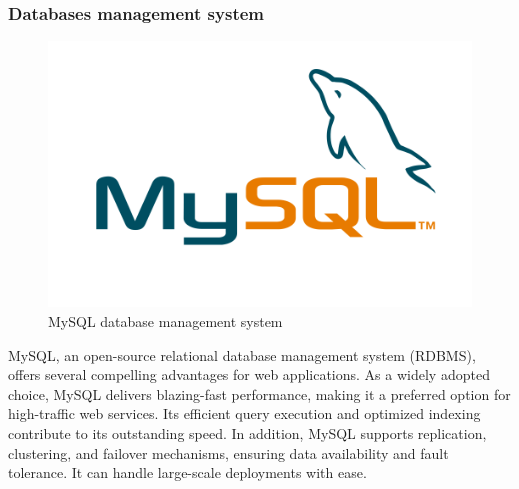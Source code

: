     \subsubsection{Databases management system} \label{Databases management system}
    \begin{figure}[H]
			\centering
			\includegraphics[scale=0.15]{graphics/mysql-logo.png}
			\caption{MySQL database management system}
			\label{fig:mySQL}
	\end{figure}

     MySQL, an open-source relational database management system (RDBMS), offers several compelling advantages for web applications. As a widely adopted choice, MySQL delivers blazing-fast performance, making it a preferred option for high-traffic web services. Its efficient query execution and optimized indexing contribute to its outstanding speed. \cite{why_mysql} In addition, MySQL supports replication, clustering, and failover mechanisms, ensuring data availability and fault tolerance. It can handle large-scale deployments with ease. \cite{why_mysql_2}


